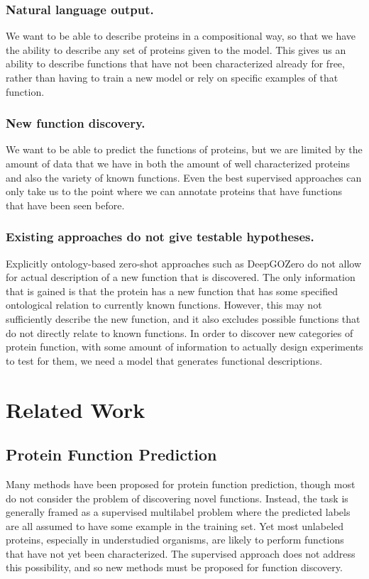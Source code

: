\documentclass{article}
\begin{document}
        \subsubsection{Natural language output.}
            We want to be able to describe proteins in a compositional way, so that we have the ability to describe any set of proteins given to the model. This gives us an ability to describe functions that have not been characterized already for free, rather than having to train a new model or rely on specific examples of that function.
        \subsubsection{New function discovery.}
            We want to be able to predict the functions of proteins, but we are limited by the amount of data that we have in both the amount of well characterized proteins and also the variety of known functions. Even the best supervised approaches can only take us to the point where we can annotate proteins that have functions that have been seen before.
        \subsubsection{Existing approaches do not give testable hypotheses.}
            Explicitly ontology-based zero-shot approaches such as DeepGOZero \cite{DeepGOZero} do not allow for actual description of a new function that is discovered.
            The only information that is gained is that the protein has a new function that has some specified ontological relation to currently known functions.
            However, this may not sufficiently describe the new function, and it also excludes possible functions that do not directly relate to known functions.
            In order to discover new categories of protein function, with some amount of information to actually design experiments to test for them, we need a model that generates functional descriptions.

\section{Related Work}
\subsection{Protein Function Prediction} %
Many methods have been proposed for protein function prediction, though most do not consider the problem of discovering novel functions.
Instead, the task is generally framed as a supervised multilabel problem where the predicted labels are all assumed to have some example in the training set.
Yet most unlabeled proteins, especially in understudied organisms, are likely to perform functions that have not yet been characterized.
The supervised approach does not address this possibility, and so new methods must be proposed for function discovery.
\end{document}

